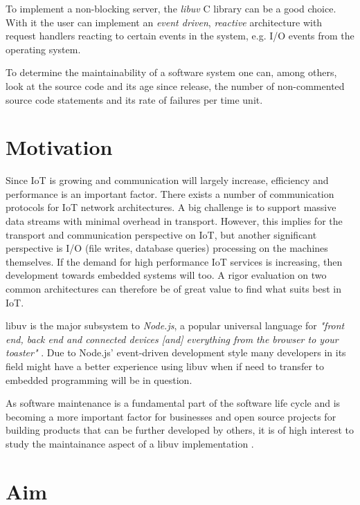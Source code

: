 To implement a non-blocking server, the \textit{libuv} C library can be a good
choice. With it the user can implement an \textit{event driven},
\textit{reactive} architecture with request handlers reacting to certain events
in the system, e.g. I/O events from the operating system. \cite{libuv-webpage}

To determine the maintainability of a software system one can, among others,
look at the source code and its age since release, the number of non-commented
source code statements and its rate of failures per time unit.
\cite{oman1992metrics}

\section{Motivation}
\label{sec:motivation}

Since IoT is growing and communication will largely increase, efficiency and
performance is an important factor. There exists a number of communication
protocols for IoT network architectures. A big challenge is to support massive
data streams with minimal overhead in transport. However, this implies for the
transport and communication perspective on IoT, but another significant
perspective is I/O (file writes, database queries) processing on the machines
themselves. If the demand for high performance IoT services is increasing, then
development towards embedded systems will too. A rigor evaluation on two common
architectures can therefore be of great value to find what suits best in IoT.

libuv is the major subsystem to \textit{Node.js}, a popular universal language
for \textit{"front end, back end and connected devices [and] everything from
the browser to your toaster"} \cite{node-js-survey-report-2016}. Due to
Node.js' event-driven development style many developers in its field might have
a better experience using libuv when if need to transfer to embedded
programming will be in question.

As software maintenance is a fundamental part of the software life cycle and is
becoming a more important factor for businesses and open source projects for
building products that can be further developed by others, it is of high
interest to study the maintainance aspect of a libuv implementation
\cite{bourque2014guide}.

\section{Aim}
\label{sec:aim}

